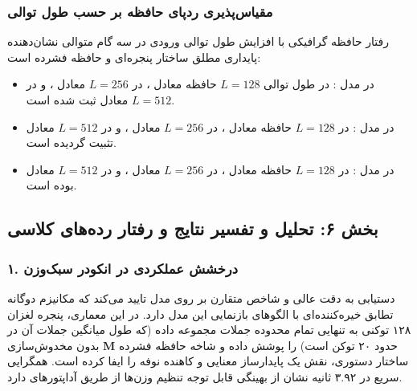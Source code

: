 \subsubsection*{مقیاس‌پذیری ردپای حافظه بر حسب طول توالی }
رفتار حافظه گرافیکی با افزایش طول توالی ورودی در سه گام متوالی نشان‌دهنده پایداری مطلق ساختار پنجره‌ای و حافظه فشرده است:
\begin{itemize}
    \item در مدل : در طول توالی $L=128$ حافظه معادل ، در $L=256$ معادل ، و در $L=512$ معادل  ثبت شده است.
    \item در مدل : در $L=128$ حافظه معادل ، در $L=256$ معادل ، و در $L=512$ معادل  تثبیت گردیده است.
    \item در مدل : در $L=128$ حافظه معادل ، در $L=256$ معادل ، و در $L=512$ معادل  بوده است.
\end{itemize}

\subsection*{بخش ۶: تحلیل و تفسیر نتایج و رفتار رده‌های کلاسی }

\subsubsection*{۱. درخشش عملکردی در انکودر سبک‌وزن  }
دستیابی به دقت عالی  و شاخص متقارن  بر روی مدل  تایید می‌کند که مکانیزم دوگانه  تطابق خیره‌کننده‌ای با الگوهای بازنمایی این مدل دارد. در این معماری، پنجره لغزان ۱۲۸ توکنی به تنهایی تمام محدوده جملات مجموعه داده  (که طول میانگین جملات آن در حدود ۲۰ توکن است) را پوشش داده و شاخه حافظه فشرده $\mathbf{M}$ بدون مخدوش‌سازی ساختار دستوری، نقش یک پایدارساز معنایی و کاهنده نوفه را ایفا کرده است. همگرایی سریع در ۳.۹۲ ثانیه نشان از بهینگی قابل توجه تنظیم وزن‌ها از طریق آداپتورهای  دارد.

